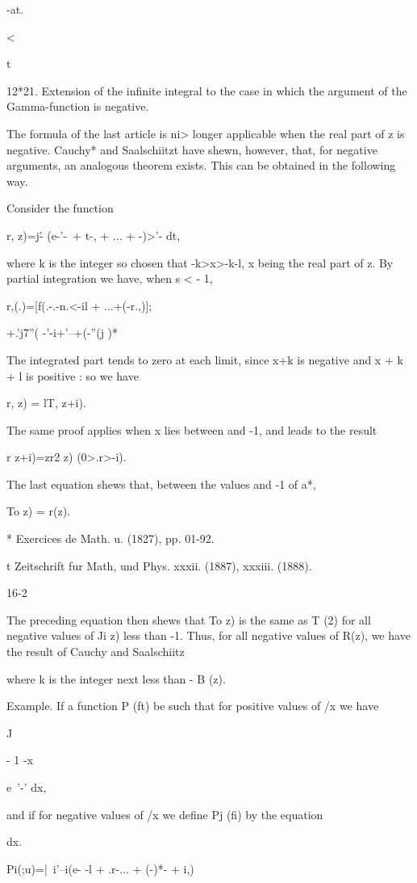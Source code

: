 -at.

<

t

12*21. Extension of the infinite integral to the case in which the
argument of the Gamma-function is negative.

The formula of the last article is ni> longer applicable when the real
part of z is negative. Cauchy* and Saalschiitzt have shewn, however,
that, for negative arguments, an analogous theorem exists. This can be
obtained in the following way.

Consider the function

r, z)=j\'- (e-'-\ + t-, + ... + -)>'- dt,

where k is the integer so chosen that -k>x>-k-l, x being the real part
of z. By partial integration we have, when s < - 1,

r,(.)=[f(.-.-n.<-il + ...+(-r.,)];

+.'j7''( -'-i+'--+(-''(j )*

The integrated part tends to zero at each limit, since x+k is negative
and x + k + l is positive : so we have

r, z) = lT, z+i).

The same proof applies when x lies between and -1, and leads to the
result

r z+i)=zr2 z) (0>.r>-i).

The last equation shews that, between the values and -1 of a*,

To z) = r(z).

* Exercices de Math. u. (1827), pp. 01-92.

t Zeitschrift fur Math, und Phys. xxxii. (1887), xxxiii. (1888).

16-2

%
%

The preceding equation then shews that To z) is the same as T (2) for
all negative values of Ji z) less than -1. Thus, for all negative
values of R(z), we have the result of Cauchy and Saalschiitz

where k is the integer next less than - B (z).

Example. If a function P (ft) be such that for positive values of /x
we have

J

- 1 -x

e~'-' dx,

and if for negative values of /x we define Pj (fi) by the equation

dx.

Pi(;u)=|\ i'--i(e- -l + .r-... + (-)*- + i,)

